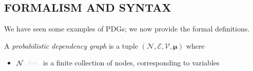 \documentclass{article}
\newcommand{\notation}[2][]{#1}
\renewcommand{\notation}[2][]{{\color{notationcolor} #2}}
\newcommand{\commentout}[1]{\ignorespaces}
\newcommand\Set{\textbf{Set}}
\newcommand{\bmu}{\boldsymbol{\mu}}
\newcommand{\V}{\mathcal V}
\newcommand{\N}{\mathcal N}
\newcommand{\Ed}{\mathcal E}
\newcommand{\modelname}{probabilistic dependency graph}
\newcommand{\MN}{PDG}
\newcommand{\MNs}{\MN s}
\numberwithin{equation}{section}
\begin{document}
\begin{notfocus}
	
	
	\section{FORMALISM AND SYNTAX}\label{sec:formal+syntax}
	
	We have seen some examples of \MNs; we now provide the formal definitions.
	\commentout{Compared to a Bayesian Network, a \MN\ still consists of a directed graph, and the edges still inform conditional probability tables, but now each edge is interpreted individually. Consider the graph
	\[ A \!\rightarrow\! C \!\leftarrow\! B,\]
	which would be interpreted as three tables $\Pr(C\mid A, B), \Pr(A), \Pr(B)$ in a BN. Interpreting it as a \MNs, there are no distributions on $A$ or $B$, and the arrows into $C$ would be split into two separate tables $\Pr(C \mid A)$ and $\Pr(B \mid A)$, rather than a joint one. }

	\def\mnvars[#1]{(\N#1, \Ed#1, \V#1, \bmu#1)}
	\begin{defn}[\MN]\label{def:model}
		A \emph{\modelname} is a tuple $\mnvars[]$ where
		\begin{itemize}[nosep]
			\item $\N\notation{:\Set}$~is a finite collection of nodes, corresponding to variables
			

\end{itemize}
\end{defn}
\end{notfocus}
\end{document}
